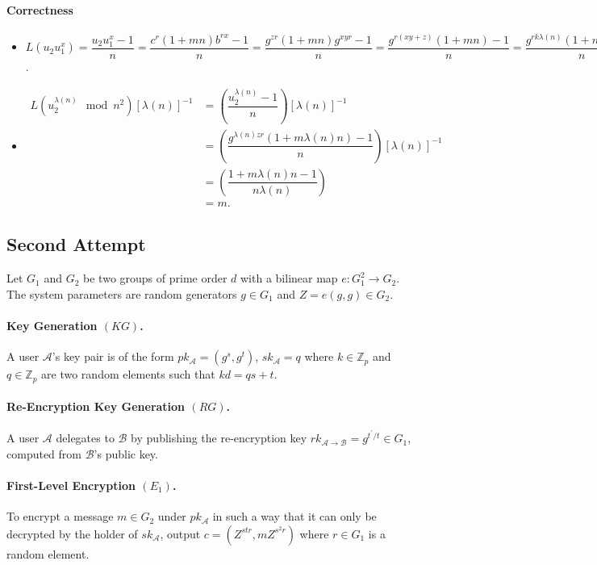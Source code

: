 \documentclass[a4paper,11pt]{article}
\begin{document}
\paragraph{Correctness}
    \begin{itemize}
      \item $L\left(u_{2}u_{1}^{x}\right)=\dfrac{u_{2}u_{1}^{x}-1}{n}=\dfrac{c^{r}(1+mn)b^{rx}-1}{n}=
    \dfrac{g^{zr}(1+mn)g^{xyr}-1}{n}
    =\dfrac{g^{r(xy+z)}(1+mn)-1}{n}=\dfrac{g^{rk\lambda(n)}(1+mn)-1}{n}=\dfrac{(1+mn)-1}{n}=m$.

      \item \begin{align*}
     L\left(u_{2}^{\lambda(n)}\mod n^{2}\right)[\lambda(n)]^{-1}&=\left(\dfrac{u_{2}^{\lambda(n)}-1}{n}\right)[\lambda(n)]^{-1} \\
     &=\left(\dfrac{g^{\lambda(n)zr}(1+m\lambda(n)n)-1}{n}\right)[\lambda(n)]^{-1} \\
     &= \left(\dfrac{1+m\lambda(n)n-1}{n\lambda(n)}\right) \\
     &=m.
    \end{align*}
    \end{itemize}


\subsection{Second Attempt}\label{sec:four:2}

Let $G_{1}$ and $G_{2}$ be two groups of prime order $d$ with a bilinear map
$e: G_{1}^{2} \longrightarrow G_{2}$. The system parameters are random generators $g \in G_{1}$ and $Z = e(g,g) \in G_{2}$.

\paragraph{Key Generation $(KG)$.} A user $\mathcal{A}$'s key pair is of the form $pk_{\mathcal{A}} = (g^{s},g^{t})$, $sk_{\mathcal{A}} = q$ where $k\in \mathbb{Z}_{p}$ and $ q \in \mathbb{Z}_{p}$ are two random elements such that $kd=qs+t$.
\paragraph{Re-Encryption Key Generation $(RG)$.} A user $\mathcal{A}$ delegates to $\mathcal{B}$ by publishing the re-encryption key $rk_{\mathcal{A}\rightarrow \mathcal{B}} = g^{t^\prime/t} \in G_{1}$, computed from $\mathcal{B}$'s public key.
\paragraph{First-Level Encryption $(E_{1})$.} To encrypt a message $m \in G_{2}$ under $pk_{\mathcal{A}}$ in such a way that it can only be decrypted by the holder of $sk_{\mathcal{A}}$, output $c = (Z^{str}, mZ^{s^{2}r})$ where $r\in G_{1}$ is a random element.
\end{document}
